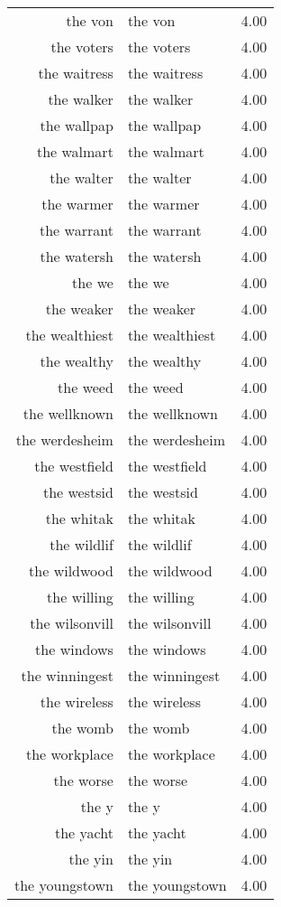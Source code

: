 \begin{table}[ht]
\begin{tabular}{rlr}
  the von & the von & 4.00 \\ 
  the voters & the voters & 4.00 \\ 
  the waitress & the waitress & 4.00 \\ 
  the walker & the walker & 4.00 \\ 
  the wallpap & the wallpap & 4.00 \\ 
  the walmart & the walmart & 4.00 \\ 
  the walter & the walter & 4.00 \\ 
  the warmer & the warmer & 4.00 \\ 
  the warrant & the warrant & 4.00 \\ 
  the watersh & the watersh & 4.00 \\ 
  the we & the we & 4.00 \\ 
  the weaker & the weaker & 4.00 \\ 
  the wealthiest & the wealthiest & 4.00 \\ 
  the wealthy & the wealthy & 4.00 \\ 
  the weed & the weed & 4.00 \\ 
  the wellknown & the wellknown & 4.00 \\ 
  the werdesheim & the werdesheim & 4.00 \\ 
  the westfield & the westfield & 4.00 \\ 
  the westsid & the westsid & 4.00 \\ 
  the whitak & the whitak & 4.00 \\ 
  the wildlif & the wildlif & 4.00 \\ 
  the wildwood & the wildwood & 4.00 \\ 
  the willing & the willing & 4.00 \\ 
  the wilsonvill & the wilsonvill & 4.00 \\ 
  the windows & the windows & 4.00 \\ 
  the winningest & the winningest & 4.00 \\ 
  the wireless & the wireless & 4.00 \\ 
  the womb & the womb & 4.00 \\ 
  the workplace & the workplace & 4.00 \\ 
  the worse & the worse & 4.00 \\ 
  the y & the y & 4.00 \\ 
  the yacht & the yacht & 4.00 \\ 
  the yin & the yin & 4.00 \\ 
  the youngstown & the youngstown & 4.00 \\ 

\end{tabular}
\end{table}
